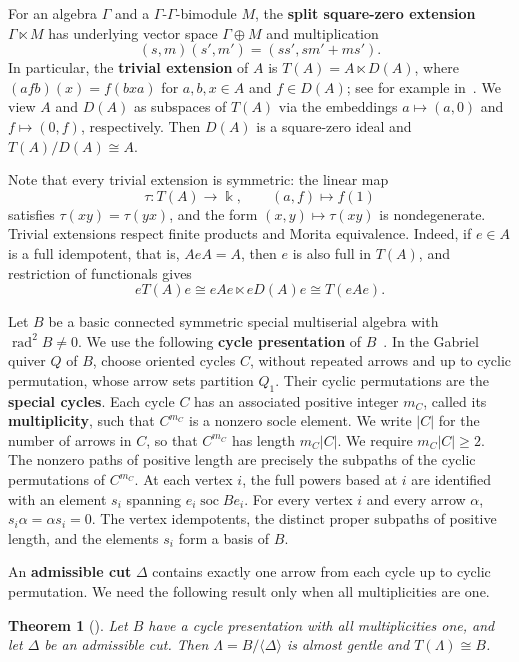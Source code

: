 \documentclass[11pt]{article}
\DeclareMathOperator{\soc}{soc}
\DeclareMathOperator{\rad}{rad}
\newcommand{\defn}[1]{\textbf{#1}}
\newtheorem{theorem}{Theorem}[section]
\theoremstyle{definition}
\begin{document}
		For an algebra $\Gamma$ and a $\Gamma$-$\Gamma$-bimodule $M$, the \defn{split square-zero extension} $\Gamma\ltimes M$ has underlying vector space $\Gamma\oplus M$ and multiplication
		\[
			(s,m)(s',m')=(ss',sm'+ms').
		\]
		In particular, the \defn{trivial extension} of $A$ is $T(A)=A\ltimes D(A)$, where $(afb)(x)=f(bxa)$ for $a,b,x\in A$ and $f\in D(A)$; see for example in~\cite[Section~2]{FernandezEtAlTrivialExtensions}.
		We view $A$ and $D(A)$ as subspaces of $T(A)$ via the embeddings $a\mapsto(a,0)$ and $f\mapsto(0,f)$, respectively.
		Then $D(A)$ is a square-zero ideal and $T(A)/D(A)\cong A$.

		Note that every trivial extension is symmetric: the linear map
		\[
			\tau:T(A)\longrightarrow\Bbbk,\qquad (a,f)\longmapsto f(1)
		\]
		satisfies $\tau(xy)=\tau(yx)$, and the form $(x,y)\mapsto\tau(xy)$ is nondegenerate.
		Trivial extensions respect finite products and Morita equivalence.
		Indeed, if $e\in A$ is a full idempotent, that is, $AeA=A$, then $e$ is also full in $T(A)$, and restriction of functionals gives
		\[
			eT(A)e\cong eAe\ltimes eD(A)e\cong T(eAe).
		\]

		Let $B$ be a basic connected symmetric special multiserial algebra with $\rad^2B\neq0$.
		We use the following \defn{cycle presentation} of $B$~\cite[Section 4]{GreenSchrollMultiserial}.
		In the Gabriel quiver $Q$ of $B$, choose oriented cycles $C$, without repeated arrows and up to cyclic permutation, whose arrow sets partition $Q_1$.
		Their cyclic permutations are the \defn{special cycles}.
		Each cycle $C$ has an associated positive integer $m_C$, called its \defn{multiplicity}, such that $C^{m_C}$ is a nonzero socle element.
		We write $|C|$ for the number of arrows in $C$, so that $C^{m_C}$ has length $m_C|C|$.
		We require $m_C|C|\geq2$.
		The nonzero paths of positive length are precisely the subpaths of the cyclic permutations of $C^{m_C}$.
		At each vertex $i$, the full powers based at $i$ are identified with an element $s_i$ spanning $e_i\soc B e_i$.
		For every vertex $i$ and every arrow $\alpha$, $s_i\alpha=\alpha s_i=0$.
		The vertex idempotents, the distinct proper subpaths of positive length, and the elements $s_i$ form a basis of $B$.

		An \defn{admissible cut} $\Delta$ contains exactly one arrow from each cycle up to cyclic permutation.
		We need the following result only when all multiplicities are one.

		\begin{theorem}[{\cite[Theorems~5.2 and~5.4]{GreenSchrollAlmost}}]
			\label{thm:cycle-admissible-cut}
			Let $B$ have a cycle presentation with all multiplicities one, and let $\Delta$ be an admissible cut.
			Then $\Lambda=B/\langle\Delta\rangle$ is almost gentle and $T(\Lambda)\cong B$.
		\end{theorem}
\end{document}
